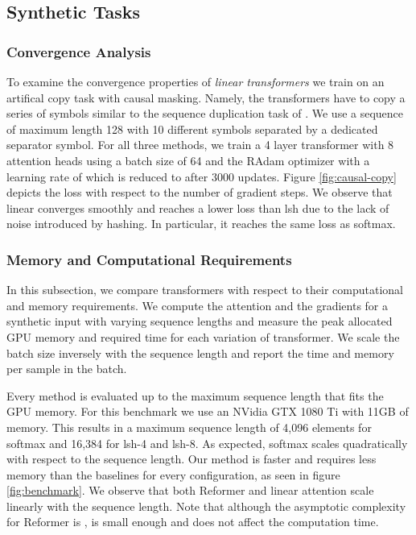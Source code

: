 \documentclass{article}
\newcommand{\linears}{\emph{linear transformers}}
\begin{document}
\subsection{Synthetic Tasks} \label{sec:synthetic}

\subsubsection{Convergence Analysis}

To examine the convergence properties of \linears{} we train on an
artifical copy task with causal masking. Namely, the transformers have to copy
a series of symbols similar to the sequence duplication task of \citet{kitaev2020reformer}. We
use a sequence of maximum length 128 with 10 different symbols separated by a
dedicated separator symbol. For all three methods, we train a 4 layer
transformer with 8 attention heads using a batch size of 64 and the RAdam
optimizer \cite{liu2019variance} with a learning rate of  which is
reduced to  after 3000 updates. Figure \ref{fig:causal-copy} depicts
the loss with respect to the number of gradient steps. We observe that
linear converges smoothly and reaches a lower loss than lsh due to
the lack of noise introduced by hashing. In particular, it reaches
the same loss as softmax.

\subsubsection{Memory and Computational Requirements}

In this subsection, we compare transformers with respect to their computational
and memory requirements. We compute the attention and the gradients for a
synthetic input with varying sequence lengths  and measure the peak allocated GPU memory and required time for each
variation of transformer.
We scale the batch size inversely with the sequence length and
report the time and memory per sample in the batch.

Every method is evaluated up to the maximum sequence length that fits the GPU
memory. For this benchmark we use an NVidia GTX 1080 Ti with 11GB of memory.
This results in a maximum sequence length of 4,096 elements for softmax and
16,384 for lsh-4 and lsh-8. As expected, softmax scales quadratically with
respect to the sequence length.  Our method is faster and requires less memory
than the baselines for every configuration, as seen in figure
\ref{fig:benchmark}.  We observe that both Reformer and linear attention scale
linearly with the sequence length. Note that although the asymptotic complexity
for Reformer is ,  is small enough and does not affect
the computation time.
\end{document}
